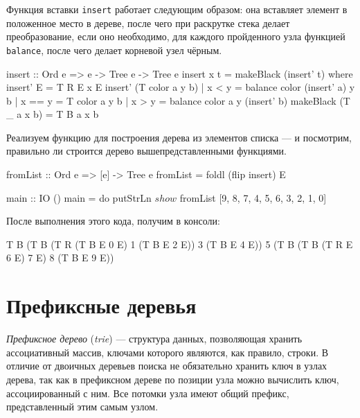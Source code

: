 Функция вставки \lstinline{insert} работает следующим образом: она вставляет элемент в положенное место в дереве, после чего при раскрутке стека делает преобразование, если оно необходимо, для каждого пройденного узла функцией \lstinline{balance}, после чего делает корневой узел чёрным.
\begin{hslst}{}{}
insert :: Ord e => e -> Tree e -> Tree e
insert x t = makeBlack (insert' t)
  where insert' E = T R E x E
        insert' (T color a y b) | x <  y = balance color (insert' a) y b
                                | x == y = T color a y b
                                | x >  y = balance color a y (insert' b)
        makeBlack (T _ a x b) = T B a x b
\end{hslst}

Реализуем функцию для построения дерева из элементов списка — и посмотрим, правильно ли строится дерево вышепредставленными функциями.
\begin{hslst}{}{}
fromList :: Ord e => [e] -> Tree e
fromList = foldl (flip insert) E

main :: IO ()
main = do
  putStrLn $ show $ fromList [9, 8, 7, 4, 5, 6, 3, 2, 1, 0]
\end{hslst}

После выполнения этого кода, получим в консоли:
\begin{plainlst}{}{}
T B (T B (T R (T B E 0 E) 1 (T B E 2 E)) 3 (T B E 4 E)) 5 (T B (T B (T R E 6 E) 7 E) 8 (T B E 9 E))
\end{plainlst}

\section{Префиксные деревья}
\label{sec:trie}
\emph{Префиксное дерево} (\emph{trie}) — структура данных, позволяющая хранить ассоциативный массив, ключами которого являются, как правило, строки. В отличие от двоичных деревьев поиска не обязательно хранить ключ в узлах дерева, так как в префиксном дереве по позиции узла можно вычислить ключ, ассоциированный с ним. Все потомки узла имеют общий префикс, представленный этим самым узлом.

